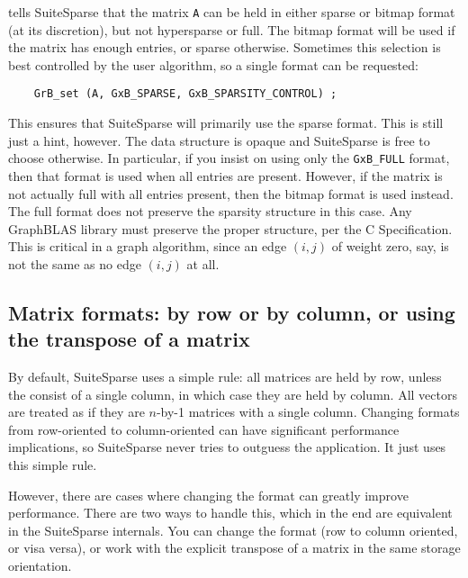 \documentclass[12pt]{article}
\begin{document}
\noindent
tells SuiteSparse that the matrix \verb'A' can be held in either sparse or
bitmap format (at its discretion), but not hypersparse or full.  The bitmap
format will be used if the matrix has enough entries, or sparse otherwise.
Sometimes this selection is best controlled by the user algorithm, so a single
format can be requested:

    {\footnotesize
    \begin{verbatim}
    GrB_set (A, GxB_SPARSE, GxB_SPARSITY_CONTROL) ; \end{verbatim}}

This ensures that SuiteSparse will primarily use the sparse format.  This is
still just a hint, however.  The data structure is opaque and SuiteSparse is
free to choose otherwise.  In particular, if you insist on using only the
\verb'GxB_FULL' format, then that format is used when all entries are present.
However, if the matrix is not actually full with all entries present, then the
bitmap format is used instead.  The full format does not preserve the sparsity
structure in this case.  Any GraphBLAS library must preserve the proper
structure, per the C Specification.  This is critical in a graph algorithm,
since an edge $(i,j)$ of weight zero, say, is not the same as no edge $(i,j)$
at all.

\subsection{Matrix formats: by row or by column, or using the transpose of
a matrix}

By default, SuiteSparse uses a simple rule:
all matrices are held by row, unless the consist of a single
column, in which case they are held by column.  All vectors are treated as if
they are $n$-by-1 matrices with a single column.  Changing formats from
row-oriented to column-oriented can have significant performance implications,
so SuiteSparse never tries to outguess the application.  It just uses this
simple rule.

However, there are cases where changing the format can greatly improve
performance.  There are two ways to handle this, which in the end are
equivalent in the SuiteSparse internals.  You can change the format (row to
column oriented, or visa versa), or work with the explicit transpose of a
matrix in the same storage orientation.
\end{document}
